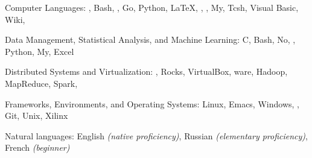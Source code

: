 \documentclass[10pt,letterpaper]{article} %
\begin{document}
\spacedhrule{0.5em}{-0.4em}



\inlineheadsection
    {Computer Languages:}
    {, Bash, , Go, Python, \LaTeX, ,
      , My, Tcsh, Visual Basic, Wiki, }

    \inlineheadsection
        {Data Management, Statistical Analysis, and Machine Learning:}
        {C, Bash, No, , Python, My, Excel}

    \inlineheadsection
        {Distributed Systems and Virtualization:}
        {, Rocks, VirtualBox, ware, Hadoop,
          MapReduce, Spark, }

    \inlineheadsection
        {Frameworks, Environments, and Operating Systems:}
        {Linux, Emacs, Windows, , Git, Unix, Xilinx}

    \inlineheadsection
        {Natural languages:}
        {English \textit{(native proficiency)}, Russian
          \textit{(elementary proficiency)}, French \textit{(beginner)}}

\spacedhrule{2.0em}{-0.4em}


\end{document}
